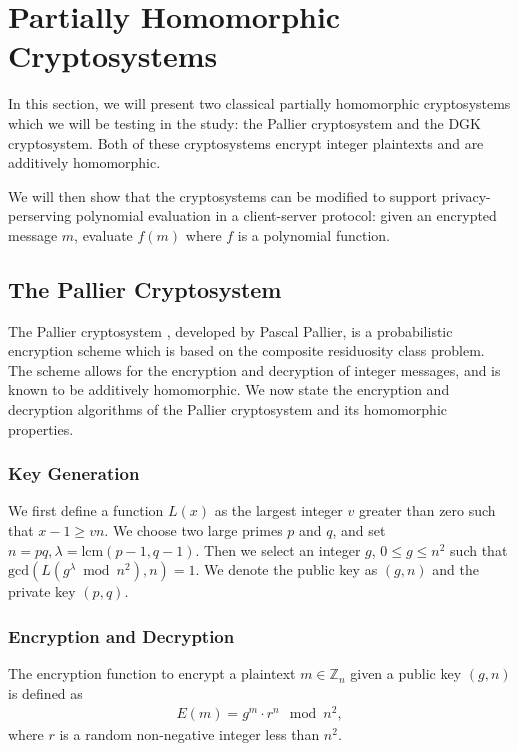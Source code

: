 \section{Partially Homomorphic Cryptosystems}

In this section, we will present two classical partially homomorphic cryptosystems which we will be testing in the study: the Pallier cryptosystem and the DGK cryptosystem. Both of these cryptosystems encrypt integer plaintexts and are additively homomorphic.

We will then show that the cryptosystems can be modified to support privacy-perserving polynomial evaluation in a client-server protocol: given an encrypted message $m$, evaluate $f(m)$ where $f$ is a polynomial function.

\subsection{The Pallier Cryptosystem}
The Pallier cryptosystem \cite{stern_public-key_1999}, developed by Pascal Pallier, is a probabilistic encryption scheme which is based on the composite residuosity class problem. The scheme allows for the encryption and decryption of integer messages, and is known to be additively homomorphic. We now state the encryption and decryption algorithms of the Pallier cryptosystem and its homomorphic properties.

\subsubsection{Key Generation}
We first define a function $L(x)$ as the largest integer $v$ greater than zero such that $x-1 \geq vn$.
We choose two large primes $p$ and $q$, and set $n = pq, \lambda = \mathrm{lcm}(p-1,q-1)$.
Then we select an integer $g$, $0\leq g \leq n^2$ such that $\mathrm{gcd}(L(g^\lambda \bmod n^2), n) = 1$.
We denote the public key as $(g,n)$ and the private key $(p,q)$.

\subsubsection{Encryption and Decryption}
The encryption function to encrypt a plaintext $m \in \mathbb{Z}_n$ given a public key $(g,n)$ is defined as
\begin{align*}
  E(m) = g^m \cdot r^n \mod{n^2},
\end{align*}
where $r$ is a random non-negative integer less than $n^2$.


